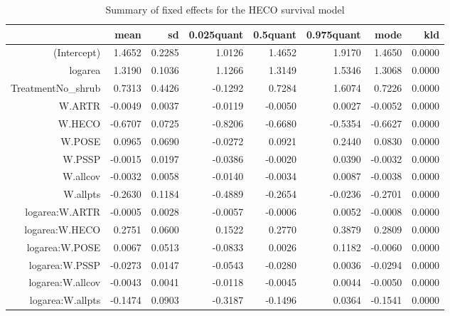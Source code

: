 \documentclass[11pt]{article}
\begin{document}
\begin{table}[ht]
\centering
\caption{Summary of fixed effects for the HECO survival model} 
\label{HECOsurvival}
\begin{tabular}{rrrrrrrr}
  \hline
 & mean & sd & 0.025quant & 0.5quant & 0.975quant & mode & kld \\ 
  \hline
(Intercept) & 1.4652 & 0.2285 & 1.0126 & 1.4652 & 1.9170 & 1.4650 & 0.0000 \\ 
  logarea & 1.3190 & 0.1036 & 1.1266 & 1.3149 & 1.5346 & 1.3068 & 0.0000 \\ 
  TreatmentNo\_shrub & 0.7313 & 0.4426 & -0.1292 & 0.7284 & 1.6074 & 0.7226 & 0.0000 \\ 
  W.ARTR & -0.0049 & 0.0037 & -0.0119 & -0.0050 & 0.0027 & -0.0052 & 0.0000 \\ 
  W.HECO & -0.6707 & 0.0725 & -0.8206 & -0.6680 & -0.5354 & -0.6627 & 0.0000 \\ 
  W.POSE & 0.0965 & 0.0690 & -0.0272 & 0.0921 & 0.2440 & 0.0830 & 0.0000 \\ 
  W.PSSP & -0.0015 & 0.0197 & -0.0386 & -0.0020 & 0.0390 & -0.0032 & 0.0000 \\ 
  W.allcov & -0.0032 & 0.0058 & -0.0140 & -0.0034 & 0.0087 & -0.0038 & 0.0000 \\ 
  W.allpts & -0.2630 & 0.1184 & -0.4889 & -0.2654 & -0.0236 & -0.2701 & 0.0000 \\ 
  logarea:W.ARTR & -0.0005 & 0.0028 & -0.0057 & -0.0006 & 0.0052 & -0.0008 & 0.0000 \\ 
  logarea:W.HECO & 0.2751 & 0.0600 & 0.1522 & 0.2770 & 0.3879 & 0.2809 & 0.0000 \\ 
  logarea:W.POSE & 0.0067 & 0.0513 & -0.0833 & 0.0026 & 0.1182 & -0.0060 & 0.0000 \\ 
  logarea:W.PSSP & -0.0273 & 0.0147 & -0.0543 & -0.0280 & 0.0036 & -0.0294 & 0.0000 \\ 
  logarea:W.allcov & -0.0043 & 0.0041 & -0.0118 & -0.0045 & 0.0044 & -0.0050 & 0.0000 \\ 
  logarea:W.allpts & -0.1474 & 0.0903 & -0.3187 & -0.1496 & 0.0364 & -0.1541 & 0.0000 \\ 
   \hline
\end{tabular}
\end{table}
\end{document}
